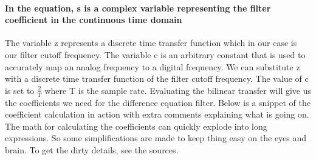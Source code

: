 \documentclass[acmlarge,screen]{acmart}
\begin{document}
	
	\paragraph{In the equation, s is a complex variable representing the filter coefficient in the continuous time domain} The variable z represents a discrete time transfer function which in our case is our filter cutoff frequency. The variable c is an arbitrary constant that is used to accurately map an analog frequency to a digital frequency. We can substitute z with a discrete time transfer function of the  filter cutoff frequency. The value of c is set to \( \frac{2}{T} \) where T is the sample rate. Evaluating the bilinear transfer will give us the coefficients we need for the difference equation filter. Below is a snippet of the coefficient calculation in action with extra comments explaining what is going on. The math for calculating the coefficients can quickly explode into long expressions. So some simplifications are made to keep thing easy on the eyes and brain. To get the dirty details, see the sources.
	
\end{document}
